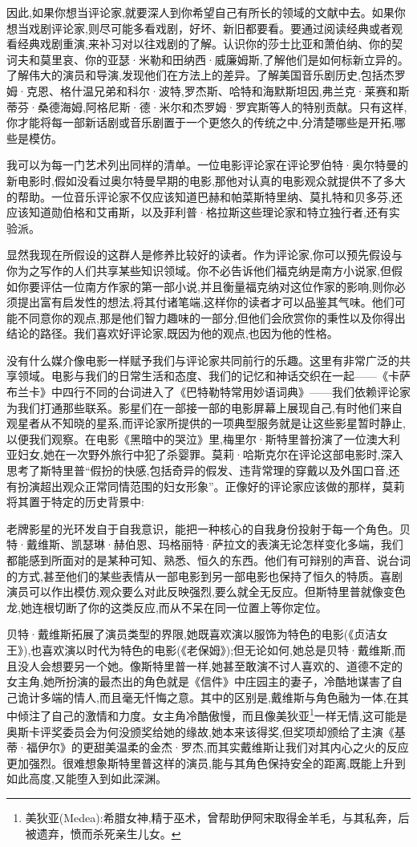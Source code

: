 因此,如果你想当评论家,就要深人到你希望自己有所长的领域的文献中去。如果你想当戏剧评论家,则尽可能多看戏剧，好坏、新旧都要看。要通过阅读经典或者观看经典戏剧重演,来补习对以往戏剧的了解。认识你的莎士比亚和萧伯纳、你的契诃夫和莫里哀、你的亚瑟·米勒和田纳西·威廉姆斯,了解他们是如何标新立异的。了解伟大的演员和导演,发现他们在方法上的差异。了解美国音乐剧历史,包括杰罗姆·克恩、格什温兄弟和科尔·波特,罗杰斯、哈特和海默斯坦因,弗兰克·莱赛和斯蒂芬·桑德海姆,阿格尼斯·德·米尔和杰罗姆·罗宾斯等人的特别贡献。只有这样,你才能将每一部新话剧或音乐剧置于一个更悠久的传统之中,分清楚哪些是开拓,哪些是模仿。

我可以为每一门艺术列出同样的清单。一位电影评论家在评论罗伯特·奥尔特曼的新电影时,假如没看过奥尔特曼早期的电影,那他对认真的电影观众就提供不了多大的帮助。一位音乐评论家不仅应该知道巴赫和帕菜斯特里纳、莫扎特和贝多芬,还应该知道勋伯格和艾甫斯，以及菲利普·格拉斯这些理论家和特立独行者,还有实验派。

显然我现在所假设的这群人是修养比较好的读者。作为评论家,你可以预先假设与你为之写作的人们共享某些知识领域。你不必告诉他们福克纳是南方小说家,但假如你要评估一位南方作家的第一部小说,并且衡量福克纳对这位作家的影响,则你必须提出富有启发性的想法,将其付诸笔端,这样你的读者才可以品鉴其气味。他们可能不同意你的观点,那是他们智力趣味的一部分,但他们会欣赏你的秉性以及你得出结论的路径。我们喜欢好评论家,既因为他的观点,也因为他的性格。

没有什么媒介像电影一样赋予我们与评论家共同前行的乐趣。这里有非常广泛的共享领域。电影与我们的日常生活和态度、我们的记忆和神话交织在一起——《卡萨布兰卡》中四行不同的台词进入了《巴特勒特常用妙语词典》——我们依赖评论家为我们打通那些联系。影星们在一部接一部的电影屏幕上展现自己,有时他们来自观星者从不知晓的星系,而评论家所提供的一项典型服务就是让这些影星暂时静止,以便我们观察。在电影《黑暗中的哭泣》里,梅里尔·斯特里普扮演了一位澳大利亚妇女,她在一次野外旅行中犯了杀婴罪。莫莉·哈斯克尔在评论这部电影时,深入思考了斯特里普“假扮的快感,包括奇异的假发、违背常理的穿戴以及外国口音,还有扮演超出观众正常同情范围的妇女形象”。正像好的评论家应该做的那样，莫莉将其置于特定的历史背景中:

老牌影星的光环发自于自我意识，能把一种核心的自我身份投射于每一个角色。贝特·戴维斯、凯瑟琳·赫伯恩、玛格丽特·萨拉文的表演无论怎样变化多端，我们都能感到所面对的是某种可知、熟悉、恒久的东西。他们有可辩别的声音、说台词的方式,甚至他们的某些表情从一部电影到另一部电影也保持了恒久的特质。喜剧演员可以作出模仿,观众要么对此反映强烈,要么就全无反应。但斯特里普就像变色龙,她连根切断了你的这类反应,而从不呆在同一位置上等你定位。

贝特·戴维斯拓展了演员类型的界限,她既喜欢演以服饰为特色的电影(《贞洁女王》),也喜欢演以时代为特色的电影(《老保姆》);但无论如何,她总是贝特·戴维斯,而且没人会想要另一个她。像斯特里普一样,她甚至敢演不讨人喜欢的、道德不定的女主角,她所扮演的最杰出的角色就是《信件》中庄园主的妻子，冷酷地谋害了自己诡计多端的情人,而且毫无忏悔之意。其中的区别是,戴维斯与角色融为一体,在其中倾注了自己的激情和力度。女主角冷酷傲慢，而且像美狄亚\footnote{美狄亚(Medea):希腊女神,精于巫术，曾帮助伊阿宋取得金羊毛，与其私奔，后被遗弃，愤而杀死亲生儿女。}一样无情,这可能是奥斯卡评奖委员会为何没颁奖给她的缘故,她本来该得奖,但奖项却颁给了主演《基蒂·福伊尔》的更甜美温柔的金杰·罗杰,而其实戴维斯让我们对其内心之火的反应更加强烈。很难想象斯特里普这样的演员,能与其角色保持安全的距离,既能上升到如此高度,又能堕入到如此深渊。

